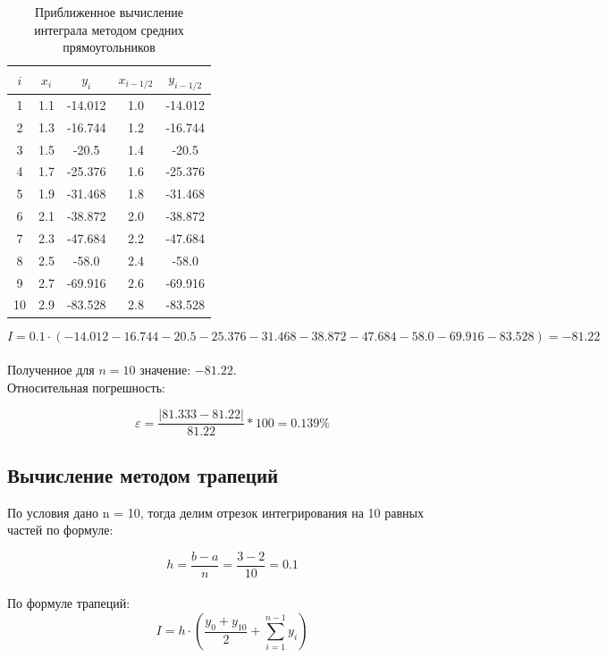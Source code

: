 \documentclass{article}
\begin{document}
      \begin{table}[H]
      	\begin{center}
      		\begin{tabular}{|c|c|c|c|c|}
      			\hline
                $i$ & $x_i$ & $y_i$ & $x_{i-1/2}$ & $y_{i-1/2}$ \\ \hline
                 1 & 1.1 & -14.012 & 1.0 & -14.012 \\ \hline
                 2 & 1.3 & -16.744 & 1.2 & -16.744 \\ \hline
                 3 & 1.5 & -20.5 & 1.4 & -20.5 \\ \hline
                 4 & 1.7 & -25.376 & 1.6 & -25.376 \\ \hline
                 5 & 1.9 & -31.468 & 1.8 & -31.468 \\ \hline
                 6 & 2.1 & -38.872 & 2.0 & -38.872 \\ \hline
                 7 & 2.3 & -47.684 & 2.2 & -47.684 \\ \hline
                 8 & 2.5 & -58.0 & 2.4 & -58.0 \\ \hline
                 9 & 2.7 & -69.916 & 2.6 & -69.916 \\ \hline
                 10 & 2.9 & -83.528 & 2.8 & -83.528 \\ \hline
      		\end{tabular}
      		\caption{Приближенное вычисление интеграла методом средних прямоугольников}
      	\end{center}
      \end{table}
      
      \[I = 0.1\cdot (-14.012 -16.744 -20.5 -25.376 -31.468 -38.872 -47.684 -58.0 -69.916 -83.528) = -81.22\]
      \\
      Полученное для $n=10$ значение: $-81.22$.
      \\
      Относительная погрешность: 
      
      $$\varepsilon = \frac{|81.333-81.22|}{81.22}*100=0.139\%$$
      
      \subsection{Вычисление методом трапеций}
      
      По условия дано n = 10, тогда делим отрезок интегрирования на 10 равных частей по формуле:
      
      \[h=\frac{b-a}{n} = \frac{3-2}{10} = 0.1\]
      \\
      По формуле трапеций: 
      \[I = h\cdot \left(\frac{y_0+y_{10}}{2}+\sum_{i=1}^{n-1}y_i\right)\]
\end{document}

